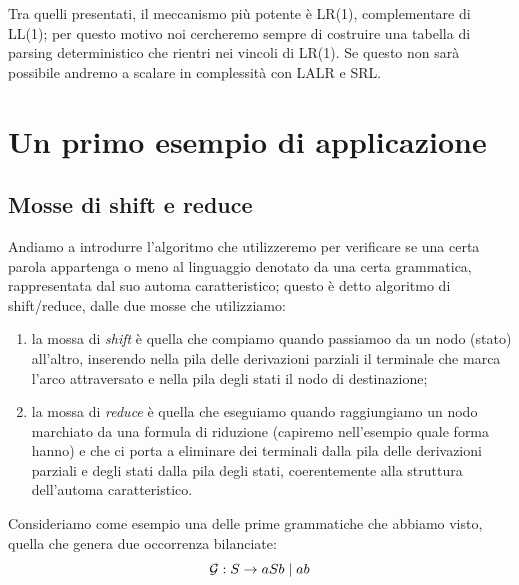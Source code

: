 \documentclass[class=book, crop=false, oneside, 12pt]{standalone}
\begin{document}
Tra quelli presentati, il meccanismo più potente è LR(1), complementare di LL(1); per questo motivo noi cercheremo sempre di costruire una tabella di parsing deterministico che rientri nei vincoli di LR(1). Se questo non sarà possibile andremo a scalare in complessità con LALR e SRL.

\section{Un primo esempio di applicazione}
\subsection{Mosse di shift e reduce}
Andiamo a introdurre l'algoritmo che utilizzeremo per verificare se una certa parola appartenga o meno al linguaggio denotato da una certa grammatica, rappresentata dal suo automa caratteristico; questo è detto algoritmo di shift/reduce, dalle due mosse che utilizziamo:
\begin{enumerate}
    \item la mossa di \emph{shift} è quella che compiamo quando passiamoo da un nodo (stato) all'altro, inserendo nella pila delle derivazioni parziali il terminale che marca l'arco attraversato e nella pila degli stati il nodo di destinazione;
    \item la mossa di \emph{reduce} è quella che eseguiamo quando raggiungiamo un nodo marchiato da una formula di riduzione (capiremo nell'esempio quale forma hanno) e che ci porta a eliminare dei terminali dalla pila delle derivazioni parziali e degli stati dalla pila degli stati, coerentemente alla struttura dell'automa caratteristico.
\end{enumerate}
Consideriamo come esempio una delle prime grammatiche che abbiamo visto, quella che genera due occorrenza bilanciate:
\begin{equation*}
    \label{balanced}
    \mathcal{G}: S \to aSb \mid ab
\end{equation*}
\end{document}
